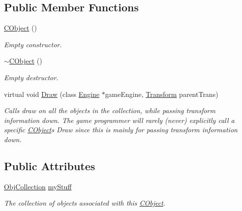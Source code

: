 \subsection*{Public Member Functions}
\begin{DoxyCompactItemize}
\item 
\hypertarget{class_c_object_ac44111d5ac75248a616df61b038c4153}{}\label{class_c_object_ac44111d5ac75248a616df61b038c4153} 
\hyperlink{class_c_object_ac44111d5ac75248a616df61b038c4153}{C\+Object} ()
\begin{DoxyCompactList}\small\item\em Empty constructor. \end{DoxyCompactList}\item 
\hypertarget{class_c_object_a93a3c3bc7d9a6462ef00e25404d9b0eb}{}\label{class_c_object_a93a3c3bc7d9a6462ef00e25404d9b0eb} 
\hyperlink{class_c_object_a93a3c3bc7d9a6462ef00e25404d9b0eb}{$\sim$\+C\+Object} ()
\begin{DoxyCompactList}\small\item\em Empty destructor. \end{DoxyCompactList}\item 
virtual void \hyperlink{class_c_object_a65338dd4ac20a20340875597344c0c4b}{Draw} (class \hyperlink{class_engine}{Engine} $\ast$game\+Engine, \hyperlink{class_transform}{Transform} parent\+Trans)
\begin{DoxyCompactList}\small\item\em Calls draw on all the objects in the collection, while passing transform information down. The game programmer will rarely (never) explicitly call a specific \hyperlink{class_c_object}{C\+Object}\textquotesingle{}s Draw since this is mainly for passing transform information down. \end{DoxyCompactList}\end{DoxyCompactItemize}
\subsection*{Public Attributes}
\begin{DoxyCompactItemize}
\item 
\hypertarget{class_c_object_a3248fbe274d6d69f38fccb60fdd5ceb3}{}\label{class_c_object_a3248fbe274d6d69f38fccb60fdd5ceb3} 
\hyperlink{class_obj_collection}{Obj\+Collection} \hyperlink{class_c_object_a3248fbe274d6d69f38fccb60fdd5ceb3}{my\+Stuff}
\begin{DoxyCompactList}\small\item\em The collection of objects associated with this \hyperlink{class_c_object}{C\+Object}. \end{DoxyCompactList}\end{DoxyCompactItemize}


